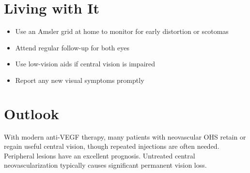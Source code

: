 \section{Living with It}
\begin{itemize}[noitemsep]
  \item Use an Amsler grid at home to monitor for early distortion or scotomas
  \item Attend regular follow-up for both eyes
  \item Use low-vision aids if central vision is impaired
  \item Report any new visual symptoms promptly
\end{itemize}
\section{Outlook}
With modern anti-VEGF therapy, many patients with neovascular OHS retain or regain useful central vision, though repeated injections are often needed. Peripheral lesions have an excellent prognosis. Untreated central neovascularization typically causes significant permanent vision loss.
